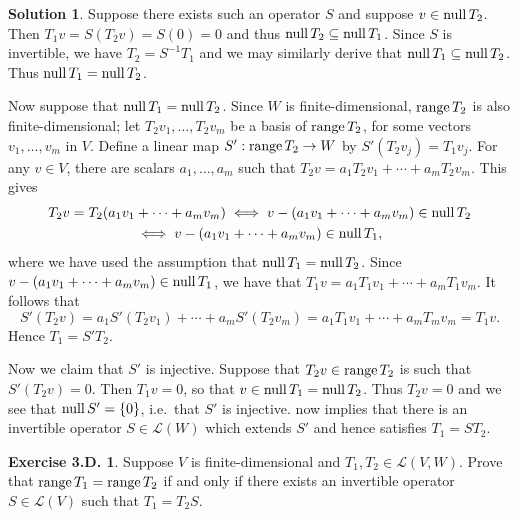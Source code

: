 \documentclass[12pt]{article}
\theoremstyle{definition}
\theoremstyle{exercise}
\newtheorem{exercise}{Exercise 3.D.}
\theoremstyle{solution}
\newtheorem*{solution}{Solution}
\newcommand{\lmap}{\mathcal{L}}
\newcommand{\Null}{\text{null\,}}
\newcommand{\Range}{\text{range\,}}
\begin{document}
\begin{solution}
    Suppose there exists such an operator \( S \) and suppose \( v \in \Null T_2 \). Then \( T_1 v = S(T_2v) = S(0) = 0 \) and thus \( \Null T_2 \subseteq \Null T_1 \). Since \( S \) is invertible, we have \( T_2 = S^{-1} T_1 \) and we may similarly derive that \( \Null T_1 \subseteq \Null T_2 \). Thus \( \Null T_1 = \Null T_2 \).

    Now suppose that \( \Null T_1 = \Null T_2 \). Since \( W \) is finite-dimensional, \( \Range T_2 \) is also finite-dimensional; let \( T_2 v_1, \ldots, T_2 v_m \) be a basis of \( \Range T_2 \), for some vectors \( v_1, \ldots, v_m \) in \( V \). Define a linear map \( S' : \Range T_2 \to W \) by \( S'(T_2 v_j) = T_1 v_j \). For any \( v \in V \), there are scalars \( a_1, \ldots, a_m \) such that \( T_2v = a_1 T_2v_1 + \cdots + a_m T_2v_m \). This gives
    \begin{multline*}
        T_2v = T_2(a_1 v_1 + \cdots + a_m v_m) \iff v - (a_1 v_1 + \cdots + a_m v_m) \in \Null T_2 \\ \iff v - (a_1 v_1 + \cdots + a_m v_m) \in \Null T_1, 
    \end{multline*}
    where we have used the assumption that \( \Null T_1 = \Null T_2 \). Since \( v - (a_1 v_1 + \cdots + a_m v_m) \in \Null T_1 \), we have that \( T_1v = a_1 T_1v_1 + \cdots + a_m T_1v_m \). It follows that
    \[
        S'(T_2v) = a_1 S'(T_2v_1) + \cdots + a_m S'(T_2v_m) = a_1 T_1v_1 + \cdots + a_m T_mv_m = T_1v.
    \]
    Hence \( T_1 = S'T_2 \).
    
    Now we claim that \( S' \) is injective. Suppose that \( T_2v \in \Range T_2 \) is such that \( S'(T_2v) = 0 \). Then \( T_1v = 0 \), so that \( v \in \Null T_1 = \Null T_2 \). Thus \( T_2v = 0 \) and we see that \( \Null S' = \{ 0 \} \), i.e.\ that \( S' \) is injective.  now implies that there is an invertible operator \( S \in \lmap(W) \) which extends \( S' \) and hence satisfies \( T_1 = ST_2 \).
\end{solution}

\begin{exercise}
\label{ex:5}
    Suppose \( V \) is finite-dimensional and \( T_1, T_2 \in \lmap(V, W) \). Prove that \( \Range T_1 = \Range T_2 \) if and only if there exists an invertible operator \( S \in \lmap(V) \) such that \( T_1 = T_2 S \).
\end{exercise}
\end{document}
